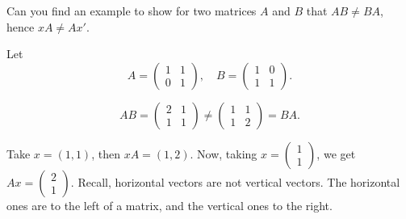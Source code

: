 \begin{exercise} Can you find an example to
  show for two matrices $A$ and $B$ that $AB\neq BA$, hence
  $x A \neq A x'$.
  \begin{hint}
    Let 
    \begin{equation*}
A =
    \begin{pmatrix}
      1 & 1 \\ 
0&1
    \end{pmatrix},
\quad   B=
    \begin{pmatrix}
      1 & 0 \\ 
1&1
    \end{pmatrix}.
    \end{equation*}
  \end{hint}

  \begin{solution}
    \begin{equation*}
      AB =  
    \begin{pmatrix}
      2 & 1 \\ 
1&1
    \end{pmatrix} 
\neq
    \begin{pmatrix}
      1 & 1 \\ 
1&2
    \end{pmatrix} 
= BA.
    \end{equation*}

Take $x=(1,1)$, then $x A=(1,2)$. Now, taking $x=
\begin{pmatrix}
  1 \\
1
\end{pmatrix}
$, we get $Ax = 
\begin{pmatrix}
  2 \\
1
\end{pmatrix}.  $
Recall, horizontal vectors are not vertical vectors. The horizontal
ones are to the left of a matrix, and the vertical ones to the right.
  \end{solution}
\end{exercise}

